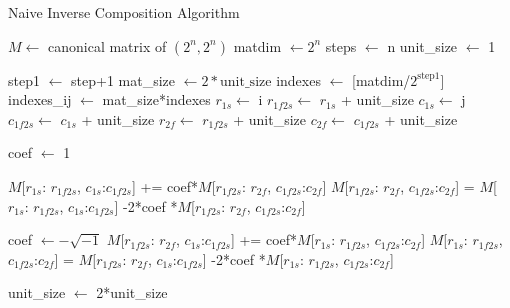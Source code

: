 \documentclass[twocolumn]{article}
\begin{document}
\begin{algorithm}
    \caption{Naive Inverse Composition Algorithm}\label{alg:naive_inverse}
    \begin{algorithmic}
        \Require $M \gets$ canonical matrix of $(2^n, 2^n)$
        \State matdim $\gets 2^n$
        \State steps $\gets$ n
        \State unit\_size $\gets$ 1

            \State step1 $\gets$ step+1
            \State mat\_size $\gets 2*\text{unit\_size}$
            \State indexes $\gets$ [matdim/$2^{\text{step1}}$]
            \State indexes\_ij $\gets$ mat\_size*indexes
                \State $r_{1s}\gets$ i
                \State $r_{1f2s}\gets$ $r_{1s}$ + unit\_size
                \State $c_{1s}\gets$ j
                \State $c_{1f2s}\gets$ $c_{1s}$ + unit\_size
                \State $r_{2f}\gets$ $r_{1f2s}$ + unit\_size
                \State $c_{2f}\gets$ $c_{1f2s}$ + unit\_size

                \State coef $\gets$ 1

                \State $M$[$r_{1s}$: $r_{1f2s}$, $c_{1s}$:$c_{1f2s}$] += coef*$M$[$r_{1f2s}$: $r_{2f}$, $c_{1f2s}$:$c_{2f}$]
                \State $M$[$r_{1f2s}$: $r_{2f}$, $c_{1f2s}$:$c_{2f}$] = $M$[$r_{1s}$: $r_{1f2s}$, $c_{1s}$:$c_{1f2s}$] -2*coef *$M$[$r_{1f2s}$: $r_{2f}$, $c_{1f2s}$:$c_{2f}$]

                \State coef $\gets - \sqrt{-1}$ 
                \State $M$[$r_{1f2s}$: $r_{2f}$, $c_{1s}$:$c_{1f2s}$] += coef*$M$[$r_{1s}$: $r_{1f2s}$, $c_{1f2s}$:$c_{2f}$]
                \State $M$[$r_{1s}$: $r_{1f2s}$, $c_{1f2s}$:$c_{2f}$] = $M$[$r_{1f2s}$: $r_{2f}$, $c_{1s}$:$c_{1f2s}$] -2*coef *$M$[$r_{1s}$: $r_{1f2s}$, $c_{1f2s}$:$c_{2f}$]
                
                \EndFor
            \EndFor
            \State unit\_size $\gets$ 2*unit\_size
        \EndFor
    \end{algorithmic}
\end{algorithm}
\end{document}
